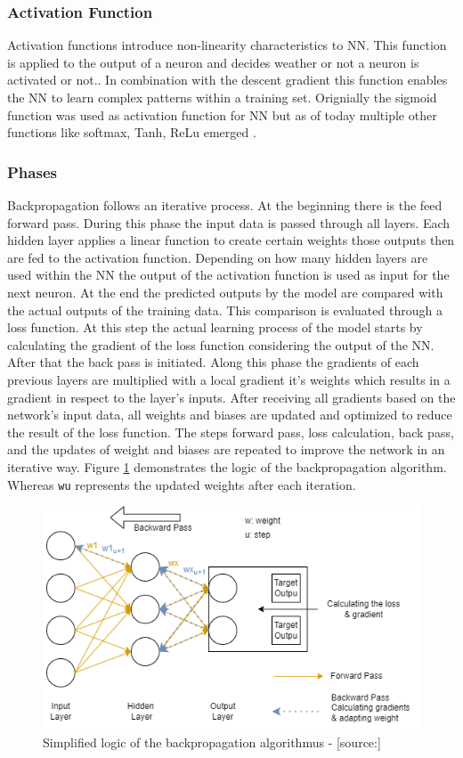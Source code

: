 \subsubsection{Activation Function}
Activation functions introduce non-linearity characteristics to NN. This function is applied to the output of a neuron and decides weather or not a neuron is activated or not.\cite{activation}. In combination with the descent gradient this function enables the NN to learn complex patterns within a training set. Orignially the sigmoid function \cite{bp_basic} was used as activation function for NN but as of today multiple other functions like softmax, Tanh, ReLu emerged \cite{activation}.

\subsubsection{Phases} 
 Backpropagation follows an iterative process. At the beginning there is the feed forward pass. During this phase the input data is passed through all layers. Each hidden layer applies a linear function to create certain weights those outputs then are fed to the activation function. Depending on how many hidden layers are used within the NN the output of the activation function is used as input for the next neuron. At the end the predicted outputs by the model are compared with the actual outputs of the training data. This comparison is evaluated through a loss function. At this step the actual learning process of the model starts by calculating the gradient of the loss function considering the output of the NN. After that the back pass is initiated. Along this phase the gradients of each previous layers are multiplied with a local gradient it's weights which results in a gradient in respect to the layer's inputs. After receiving all gradients  based on the network's input data, all weights and biases are updated and optimized to reduce the result of the loss function. The steps forward pass, loss calculation, back pass, and the updates of weight and biases are repeated to improve the network in an iterative way. \cite{bp_basic} Figure \ref{fig:bp} demonstrates the logic of the backpropagation algorithm. Whereas \verb|wu| represents the updated weights after each iteration.  

\begin{figure}[H]
	\centering
		\includegraphics[width=14cm]{images/bp}
	\caption{Simplified logic of the backpropagation algorithmus - [source:\cite{bp_basic}]}
	\label{fig:bp}
\end{figure}
